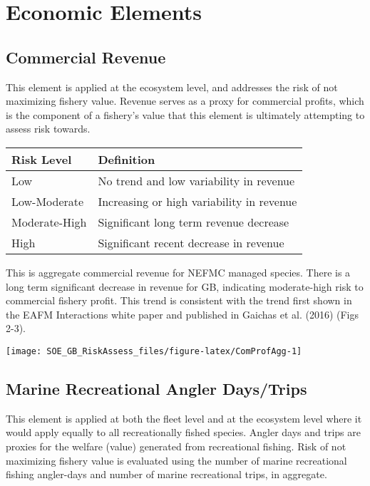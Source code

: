 \documentclass[11pt,]{article}
\let\origfigure\figure
\let\endorigfigure\endfigure
\renewenvironment{figure}[1][2] {
    \expandafter\origfigure\expandafter[H]
} {
    \endorigfigure
}
\begin{document}
\section{Economic Elements}\label{economic-elements}

\subsection{Commercial Revenue}\label{commercial-revenue}

This element is applied at the ecosystem level, and addresses the risk
of not maximizing fishery value. Revenue serves as a proxy for
commercial profits, which is the component of a fishery's value that
this element is ultimately attempting to assess risk towards.

\begin{longtable}[]{@{}ll@{}}
\toprule
Risk Level & Definition\tabularnewline
\midrule
\endhead
Low & No trend and low variability in revenue\tabularnewline
Low-Moderate & Increasing or high variability in revenue\tabularnewline
Moderate-High & Significant long term revenue decrease\tabularnewline
High & Significant recent decrease in revenue\tabularnewline
\bottomrule
\end{longtable}

This is aggregate commercial revenue for NEFMC managed species. There is
a long term significant decrease in revenue for GB, indicating
moderate-high risk to commercial fishery profit. This trend is
consistent with the trend first shown in the EAFM Interactions white
paper and published in Gaichas et al. (2016) (Figs 2-3).

\begin{figure}

{\centering \texttt{[image: SOE\_GB\_RiskAssess\_files/figure-latex/ComProfAgg-1]} 

}

\caption{Aggregate New England managed species revenue  \label{comprofagg}}\label{fig:ComProfAgg}
\end{figure}

\subsection{Marine Recreational Angler
Days/Trips}\label{marine-recreational-angler-daystrips}

This element is applied at both the fleet level and at the ecosystem
level where it would apply equally to all recreationally fished species.
Angler days and trips are proxies for the welfare (value) generated from
recreational fishing. Risk of not maximizing fishery value is evaluated
using the number of marine recreational fishing angler-days and number
of marine recreational trips, in aggregate.
\end{document}
